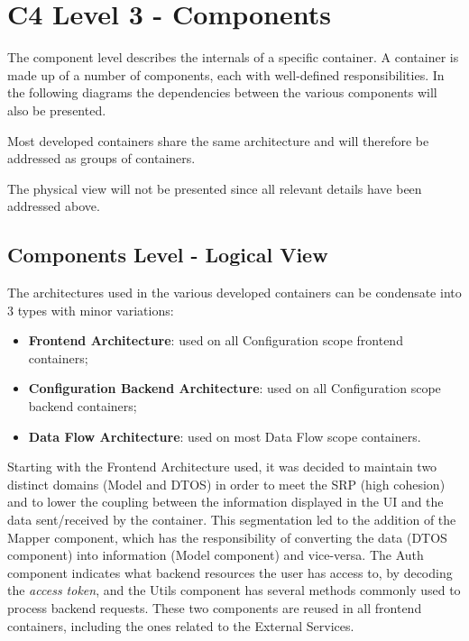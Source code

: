 
\chapter{C4 Level 3 - Components}
\label{appendix:design:architecture:platform:components}

The component level describes the internals of a specific container. A container is made up of a number of components, each with well-defined responsibilities. In the following diagrams the dependencies between the various components will also be presented.

Most developed containers share the same architecture and will therefore be addressed as groups of containers.

The physical view will not be presented since all relevant details have been addressed above.

\section{Components Level - Logical View}
\label{par:design:architecture:platform:components:logical}

The architectures used in the various developed containers can be condensate into 3 types with minor variations:

\begin{itemize}
   \item \textbf{Frontend Architecture}: used on all Configuration scope frontend containers;
   \item \textbf{Configuration Backend Architecture}: used on all Configuration scope backend containers;
   \item \textbf{Data Flow Architecture}: used on most Data Flow scope containers.
\end{itemize}

Starting with the Frontend Architecture used, it was decided to maintain two distinct domains (Model and DTOS) in order to meet the \gls{SRP} (high cohesion) and to lower the coupling between the information displayed in the UI and the data sent/received by the container. This segmentation led to the addition of the Mapper component, which has the responsibility of converting the data (DTOS component) into information (Model component) and vice-versa. The Auth component indicates what backend resources the user has access to, by decoding the \textit{access token}, and the Utils component has several methods commonly used to process backend requests. These two components are reused in all frontend containers, including the ones related to the External Services.

